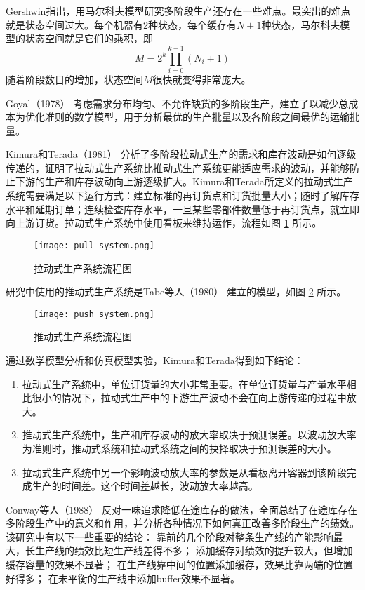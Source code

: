 Gershwin指出，用马尔科夫模型研究多阶段生产还存在一些难点。最突出的难点就是状态空间过大。每个机器有2种状态，每个缓存有$N+1$种状态，马尔科夫模型的状态空间就是它们的乘积，即
\[
M = 2^k \prod_{i=0}^{k-1}(N_i+1)
\]
随着阶段数目的增加，状态空间$M$很快就变得非常庞大。

Goyal（1978） \cite{goyal_economic_1978} 考虑需求分布均匀、不允许缺货的多阶段生产，建立了以减少总成本为优化准则的数学模型，用于分析最优的生产批量以及各阶段之间最优的运输批量。

Kimura和Terada（1981）\cite{kimura_design_1981} 分析了多阶段拉动式生产的需求和库存波动是如何逐级传递的，证明了拉动式生产系统比推动式生产系统更能适应需求的波动，并能够防止下游的生产和库存波动向上游逐级扩大。Kimura和Terada所定义的拉动式生产系统需要满足以下运行方式：建立标准的再订货点和订货批量大小；随时了解库存水平和延期订单；连续检查库存水平，一旦某些零部件数量低于再订货点，就立即向上游订货。拉动式生产系统中使用看板来维持运作，流程如图 \ref{fig:pull_system} 所示。

\begin{figure}[htbp]
\centering
\texttt{[image: pull\_system.png]}
\caption{拉动式生产系统流程图}
\label{fig:pull_system}
\end{figure}

研究中使用的推动式生产系统是Tabe等人（1980） \cite{tabe_analysis_1980} 建立的模型，如图 \ref{fig:push_system} 所示。

\begin{figure}[htbp]
\centering
\texttt{[image: push\_system.png]}
\caption{推动式生产系统流程图}
\label{fig:push_system}
\end{figure}

通过数学模型分析和仿真模型实验，Kimura和Terada得到如下结论：
\begin{enumerate}
\item
拉动式生产系统中，单位订货量的大小非常重要。在单位订货量与产量水平相比很小的情况下，拉动式生产中的下游生产波动不会在向上游传递的过程中放大。
\item
推动式生产系统中，生产和库存波动的放大率取决于预测误差。以波动放大率为准则时，推动式系统和拉动式系统之间的抉择取决于预测误差的大小。
\item
拉动式生产系统中另一个影响波动放大率的参数是从看板离开容器到该阶段完成生产的时间差。这个时间差越长，波动放大率越高。
\end{enumerate}

Conway等人（1988） \cite{conway_role_1988} 反对一味追求降低在途库存的做法，全面总结了在途库存在多阶段生产中的意义和作用，并分析各种情况下如何真正改善多阶段生产的绩效。该研究中有以下一些重要的结论：
靠前的几个阶段对整条生产线的产能影响最大，长生产线的绩效比短生产线差得不多；
添加缓存对绩效的提升较大，但增加缓存容量的效果不显著；
在生产线靠中间的位置添加缓存，效果比靠两端的位置好得多；
在未平衡的生产线中添加buffer效果不显著。








